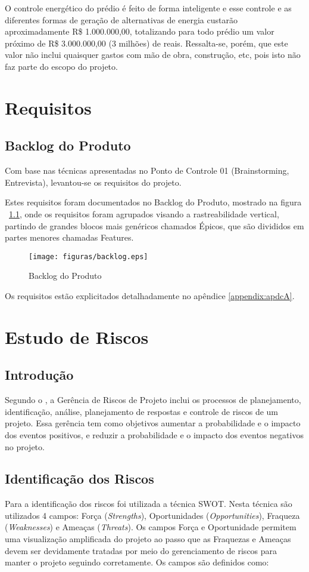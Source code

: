 O controle energético do prédio é feito de forma inteligente e esse controle e
as diferentes formas de geração de alternativas de energia custarão
aproximadamente R\$ 1.000.000,00, totalizando para todo prédio um valor
próximo de R\$ 3.000.000,00 (3 milhões) de reais. Ressalta-se, porém, que este
valor não inclui quaisquer gastos com mão de obra, construção, etc, pois isto
não faz parte do escopo do projeto.

\chapter{Requisitos\label{ch:requisitos}}
\section{Backlog do Produto}
Com base nas técnicas apresentadas no Ponto de Controle 01 (Brainstorming, Entrevista), levantou-se os requisitos do projeto.

Estes requisitos foram documentados no Backlog do Produto, mostrado na figura ~\ref{fig:backlog}, onde os requisitos foram agrupados visando a rastreabilidade vertical, partindo de grandes blocos mais genéricos chamados Épicos, que são divididos em partes menores chamadas Features.

\begin{figure}[!h]
  \centering
  	\texttt{[image: figuras/backlog.eps]}
   \caption{Backlog do Produto\label{fig:backlog}}
\end{figure}

Os requisitos estão explicitados detalhadamente no apêndice \ref{appendix:apdcA}.

\chapter{Estudo de Riscos}
\section{Introdução}
Segundo o \cite{pmbok}, a Gerência de Riscos de Projeto inclui os processos de planejamento, identificação,
análise, planejamento de respostas e controle de riscos de um projeto. Essa gerência tem como objetivos aumentar a
probabilidade e o impacto dos eventos positivos, e reduzir a probabilidade e o impacto dos eventos negativos no projeto.

\section{Identificação dos Riscos}
Para a identificação dos riscos foi utilizada a técnica SWOT. Nesta técnica são utilizados 4 campos: Força (\textit{Strengths}),
 Oportunidades (\textit{Opportunities}), Fraqueza (\textit{Weaknesses}) e Ameaças (\textit{Threats}). Os campos Força e Oportunidade permitem uma
 visualização amplificada do projeto ao passo que as Fraquezas e Ameaças devem ser devidamente tratadas por meio do
 gerenciamento de riscos para manter o projeto seguindo corretamente. Os campos são definidos como:

